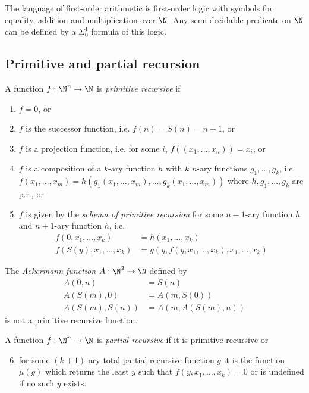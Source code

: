 \documentclass{article}
\begin{document}
\begin{theorem}
	The language of first-order arithmetic is first-order logic with symbols for
	equality, addition and multiplication over $\N$. Any semi-decidable predicate on
	$\N$ can be defined by a $\Sigma_0^1$ formula of this logic.
\end{theorem}

\subsection{Primitive and partial recursion}

\begin{definition}
	A function $f:\N^n\to\N$ is \emph{primitive recursive} if
	\begin{enumerate}[label=R\arabic*.]
		\item $f=0$, or
		\item $f$ is the successor function, i.e. $f(n)=S(n)=n+1$, or
		\item $f$ is a projection function, i.e. for some $i$, $f((x_1,...,x_n))=x_i$, or
		\item $f$ is a composition of a $k$-ary function $h$ with $k$ $n$-ary functions $g_1,...,g_k$, i.e.
		      $f(x_1,...,x_m)=h(g_1(x_1,...,x_m),...,g_k(x_1,...,x_m))$ where $h,g_1,...,g_k$ are p.r., or
		\item $f$ is given by the \emph{schema of primitive recursion} for some $n-1$-ary function $h$ and
		      $n+1$-ary function $h$, i.e.
		      \begin{align*}
			      f(0,x_1,...,x_k)    & = h(x_1,...,x_k)                    \\
			      f(S(y),x_1,...,x_k) & = g(y,f(y,x_1,...,x_k),x_1,...,x_k)
		      \end{align*}
	\end{enumerate}
\end{definition}

\begin{theorem}[Notes I.43]
	The \emph{Ackermann function} $A:\N^2\to\N$ defined by
	\begin{align*}
		A(0,n)        & = S(n)             \\
		A(S(m), 0)    & = A(m,S(0))        \\
		A(S(m), S(n)) & = A(m, A(S(m), n))
	\end{align*}
	is not a primitive recursive function.
\end{theorem}

\begin{definition}
	A function $f:\N^n\to\N$ is \emph{partial recursive} if it is primitive recursive or
	\begin{enumerate}[label=R\arabic*.]
		\setcounter{enumi}{5}
		\item for some $(k+1)$-ary total partial recursive function $g$ it is the function $\mu(g)$
		      which returns the least $y$ such that $f(y,x_1,...,x_k)=0$ or is undefined if no such $y$
		      exists.
	\end{enumerate}
\end{definition}
\end{document}
